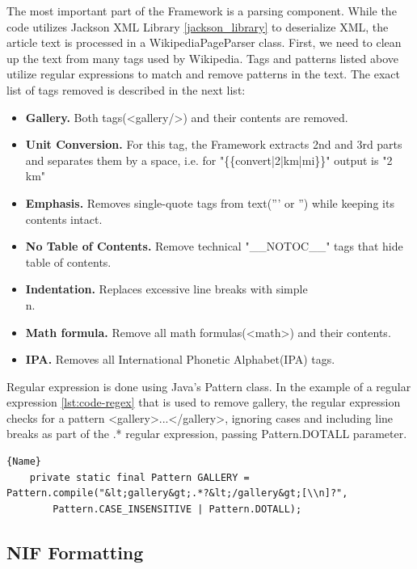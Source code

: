 \documentclass[thesis=M,english,hidelinks]{FITthesis}[2019/12/23]
\begin{document}
The most important part of the Framework is a parsing component. While the code utilizes Jackson XML Library \ref{jackson_library} to deserialize XML, the article text is processed in a WikipediaPageParser class. First, we need to clean up the text from many tags used by Wikipedia\cite{Wikipedia_Template}.  Tags and patterns listed above utilize regular expressions to match and remove patterns in the text. The exact list of tags removed is described in the next list:

\begin{itemize}
	\item \textbf{Gallery.} Both tags(<gallery/>) and their contents are removed. 
	\item \textbf{Unit Conversion.}  For this tag, the Framework extracts 2nd and 3rd parts and separates them by a space, i.e. for "\{\{convert|2|km|mi\}\}" output is "2 km"
	\item \textbf{Emphasis.} Removes single-quote tags from text(''' or '') while keeping its contents intact.
	\item \textbf{No Table of Contents.} Remove technical "\_\_NOTOC\_\_" tags that hide table of contents.
	\item \textbf{Indentation.} Replaces excessive line breaks with simple \\n.
	\item \textbf{Math formula.} Remove all math formulas(<math>) and their contents.
	\item \textbf{IPA.} Removes all International Phonetic Alphabet(IPA) tags.
\end{itemize}

Regular expression is done using Java's Pattern class. In the example of a regular expression \ref{lst:code-regex} that is used  to remove gallery, the regular expression checks for a pattern <gallery>...</gallery>, ignoring cases and including line breaks as part of the .* regular expression, passing Pattern.DOTALL parameter.

\begin{lstlisting}[caption=Example of a regular expression,frame=tlrb,  label = {lst:code-regex}]{Name}
	private static final Pattern GALLERY = Pattern.compile("&lt;gallery&gt;.*?&lt;/gallery&gt;[\\n]?",
		Pattern.CASE_INSENSITIVE | Pattern.DOTALL);
\end{lstlisting}

\subsection{NIF Formatting}
\end{document}
